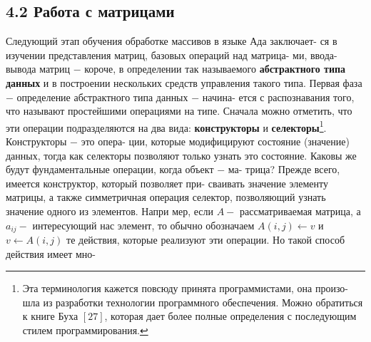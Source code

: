 \subsection{4.2 Работа с матрицами}
\noindent
Следующий этап обучения обработке массивов в языке Ада заключает-\linebreak
ся  в  изучении  представления  матриц,  базовых операций  над  матрица-\linebreak
ми,  ввода-вывода  матриц  $-$  короче,  в  определении  так  называемого\linebreak
\textbf{абстрактного  типа  данных} и  в  построении  нескольких  средств\linebreak
управления  такого типа.\newline
\hspace*{15pt}Первая  фаза $-$  определение  абстрактного  типа  данных $-$ начина-\linebreak
ется с распознавания того, что называют простейшими  операциями на\linebreak
типе.  Сначала можно отметить,  что эти  операции  подразделяются  на\linebreak
два вида: \textbf{конструкторы } и \textbf{селекторы}\footnote{
Эта терминология кажется повсюду принята программистами, она произо-\linebreak
шла из разработки технологии программного обеспечения. Можно обратиться к\linebreak
книге Буха $[27]$, которая дает более полные определения с последующим стилем\linebreak
программирования.}. Конструкторы $-$ это опера-\linebreak
ции,  которые  модифицируют состояние  (значение)  данных,  тогда как\linebreak
селекторы  позволяют только узнать это состояние.\newline
\hspace*{15pt}Каковы  же  будут фундаментальные операции,  когда объект $-$  ма-\linebreak
трица?  Прежде  всего,  имеется  конструктор,  который  позволяет  при-\linebreak
сваивать значение элементу матрицы,  а также симметричная операция\linebreak
селектор,  позволяющий  узнать  значение  одного  из  элементов.  Напри\linebreak
мер,  если $A - $ рассматриваемая  матрица,  а $a_{ij}-$ интересующий  нас\linebreak
элемент, то обычно обозначаем $A(i,j)\longleftarrow v$ и $v\longleftarrow A(i,j)$ те действия,\linebreak
которые реализуют эти операции. Но такой способ действия имеет мно-\linebreak
\newpage

